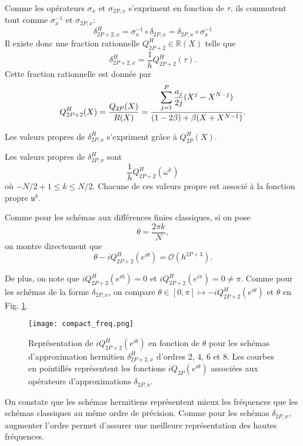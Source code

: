 Comme les opérateurs $\sigma_x$ et $\sigma_{2P,x}$ s’expriment en fonction de $\tau$, ils commutent tout comme $\sigma_x^{-1}$ et $\sigma_{2P,x}$:
\begin{equation}
\delta_{2P+2,x}^H = \sigma_x^{-1} \circ \delta_{2P,x} = \delta_{2P,x} \circ \sigma_x^{-1}
\end{equation}
Il existe donc une fraction rationnelle $Q_{2P+2}^H \in \mathbb{R}(X)$ telle que 
\begin{equation}
\delta_{2P+2,x}^H = \dfrac{1}{h} Q_{2P+2}^H( \tau ).
\end{equation}
Cette fraction rationnelle est donnée par
\begin{equation}
Q_{2P+2}^H(X) = \dfrac{Q_{2P}(X)}{R(X)} = \dfrac{\displaystyle\sum\limits_{j=1}^P \dfrac{a_j}{2j} (X^j - X^{N-j})}{(1-2\beta) + \beta ( X + X^{N-1})}.
\label{eq:pol_hermitien}
\end{equation}

Les valeurs propres de $\delta_{2P,x}^H$ s'expriment grâce à $Q_{2P}^H(X)$.

\begin{proposition}
Les valeurs propres de $\delta_{2P,x}^H$ sont 
\begin{equation}
\dfrac{1}{h} Q_{2P+2}^H (\omega^k)
\end{equation}
où $-N/2+1 \leq k \leq N/2$. Chacune de ces valeurs propre est associé à la fonction propre $\mathfrak{u}^k$.
\label{prop:eigen_mat_hermitien}
\end{proposition}

Comme pour les schémas aux différences finies classiques, si on pose \begin{equation}
\theta = \dfrac{2 \pi k}{N},
\end{equation}
on montre directement que
\begin{equation}
\theta - i Q_{2P+2}^H ( e^{i \theta} ) = \mathcal{O} \left( h^{2P+3} \right).
\end{equation}

De plus, on note que $i Q_{2P+2}^H(e^{i0}) = 0$ et $i Q_{2P+2}^H(e^{i\pi}) = 0 \neq \pi$. Comme pour les schémas de la forme $\delta_{2P,x}$, on compare $\theta \in [0 , \pi] \mapsto - i Q_{2P+2}^H(e^{i \theta})$ et $\theta$ en Fig. \ref{fig:freq_herm}.
\begin{figure}[htbp]
\begin{center}
\texttt{[image: compact\_freq.png]}
\end{center}
\caption{Représentation de $i Q_{2P+2}^H \left( e^{i \theta} \right)$ en fonction de $\theta$ pour les schémas d'approximation hermitien $\delta_{2P+2,x}^H$ d'ordres 2, 4, 6 et 8. Les courbes en pointillés représentent les fonctions $i Q_{2P}\left( e^{i \theta} \right)$ associées aux opérateurs d'approximations $\delta_{2P,x}$.}
\label{fig:freq_herm}
\end{figure}
On constate que les schémas hermitiens représentent mieux les fréquences que les schémas classiques au même ordre de précision. Comme pour les schémas $\delta_{2P,x}$, augmenter l'ordre permet d'assurer une meilleure représentation des hautes fréquences.

